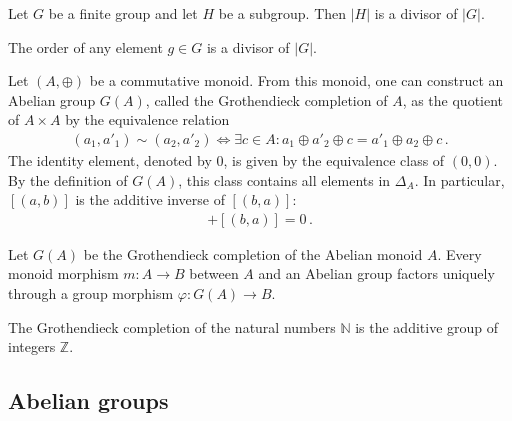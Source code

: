     \begin{theorem}[Lagrange]
        Let $G$ be a finite group and let $H$ be a subgroup. Then $|H|$ is a divisor of $|G|$.
    \end{theorem}
    \begin{result}
        The order of any element $g\in G$ is a divisor of $|G|$.
    \end{result}

    \begin{construct}\label{group:grothendieck_completion}
        Let $(A,\oplus)$ be a commutative monoid. From this monoid, one can construct an Abelian group $G(A)$, called the Grothendieck completion of $A$, as the quotient of $A\times A$ by the equivalence relation
        \begin{gather}
            (a_1,a'_1)\sim (a_2,a'_2)\iff\exists c\in A:a_1\oplus a'_2\oplus c = a'_1\oplus a_2\oplus c\,.
        \end{gather}
        The identity element, denoted by 0, is given by the equivalence class of $(0,0)$. By the definition of $G(A)$, this class contains all elements in $\Delta_A$. In particular, $[(a,b)]$ is the additive inverse of $[(b,a)]$:
        \begin{gather}
            [(a,b)] + [(b,a)] = 0\,.
        \end{gather}
    \end{construct}
    \begin{uproperty}
        Let $G(A)$ be the Grothendieck completion of the Abelian monoid $A$. Every monoid morphism $m:A\rightarrow B$ between $A$ and an Abelian group factors uniquely through a group morphism $\varphi:G(A)\rightarrow B$.
    \end{uproperty}

    \begin{example}[Integers]
        The Grothendieck completion of the natural numbers $\mathbb{N}$ is the additive group of integers $\mathbb{Z}$.
    \end{example}

\subsection{Abelian groups}

